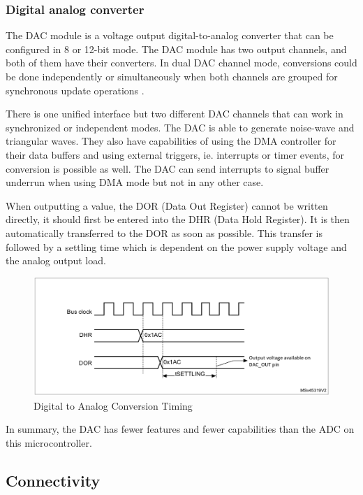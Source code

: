\subsubsection{Digital analog converter}

The DAC module is a voltage output digital-to-analog converter that can be configured in 8 or 12-bit mode. The DAC module has two output channels, and both of them have their converters. In dual DAC channel mode, conversions could be done independently or simultaneously when both channels are grouped for synchronous update operations \cite{DACDescription}.

There is one unified interface but two different DAC channels that can work in synchronized or independent modes. The DAC is able to generate noise-wave and triangular waves. They also have capabilities of using the DMA controller for their data buffers and using external triggers, ie. interrupts or timer events, for conversion is possible as well. The DAC can send interrupts to signal buffer underrun when using DMA mode but not in any other case.

When outputting a value, the DOR (Data Out Register) cannot be written directly, it should first be entered into the DHR (Data Hold Register). It is then automatically transferred to the DOR as soon as possible. This transfer is followed by a settling time which is dependent on the power supply voltage and the analog output load.

\begin{figure}[!ht]
    \centering
    \includegraphics[width=150mm, keepaspectratio]{figures/dac-timing.png}
    \caption{Digital to Analog Conversion Timing\cite{DACTime}}
    \label{fig:dac-timing}
\end{figure}

In summary, the DAC has fewer features and fewer capabilities than the ADC on this microcontroller.

\subsection{Connectivity}


